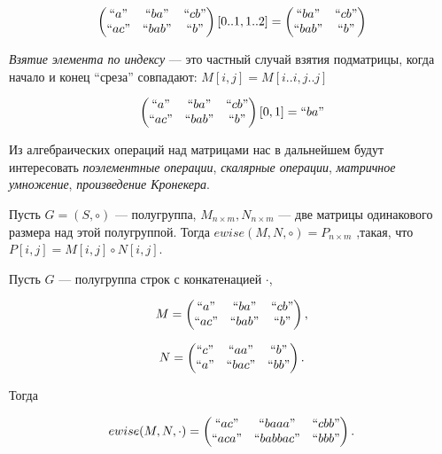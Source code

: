 \begin{example}
$$
\begin{pmatrix}
``a"  & ``ba"  & ``cb" \\
``ac" & ``bab" & ``b"  \\
\end{pmatrix}[0..1,1..2] =
\begin{pmatrix}
``ba"  & ``cb" \\
``bab" & ``b"  \\
\end{pmatrix}
$$
\end{example}


\begin{definition}
\emph{Взятие элемента по индексу} --- это частный случай взятия подматрицы, когда начало и конец ``среза'' совпадают:
$
M[i,j] = M[i..i,j..j]
$
\end{definition}

\begin{example}
$$
\begin{pmatrix}
``a"  & ``ba"  & ``cb" \\
``ac" & ``bab" & ``b"  \\
\end{pmatrix}[0,1] = ``ba"
$$
\end{example}

Из алгебраических операций над матрицами нас в дальнейшем будут интересовать \textit{поэлементные операции}, \textit{скалярные операции}, \textit{матричное умножение}, \textit{произведение Кронекера}.


\begin{definition}

Пусть $G = (S,\circ)$ --- полугруппа, $M_{n \times m}, N_{n\times m}$ --- две матрицы одинакового размера над этой полугруппой.
Тогда
$
ewise(M,N,\circ) = P_{n \times m}
$
,такая, что $P[i,j] = M[i,j] \circ N[i,j]$.
\end{definition}


\begin{example}

Пусть $G$ --- полугруппа строк с конкатенацией $\cdot$,

$$
M =
\begin{pmatrix}
``a"  & ``ba"  & ``cb" \\
``ac" & ``bab" & ``b"  \\
\end{pmatrix},
$$

$$
N =
\begin{pmatrix}
``c"  & ``aa"  & ``b" \\
``a" & ``bac" & ``bb"  \\
\end{pmatrix}.
$$

Тогда

$$
ewise(M,N, \cdot) =
\begin{pmatrix}
``ac"  & ``baaa"  & ``cbb" \\
``aca" & ``babbac" & ``bbb"  \\
\end{pmatrix}.
$$


\end{example}


